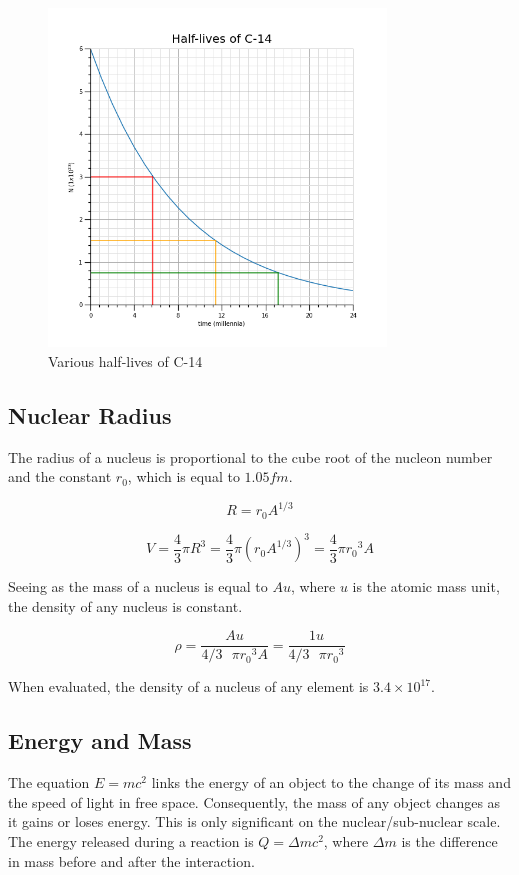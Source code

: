 \documentclass[12pt]{article}
\begin{document}
\begin{figure}[H]
\centering
\includegraphics[width=0.8\textwidth,keepaspectratio]{./images/c-14_t_half.png}
\caption{Various half-lives of C-14}
\end{figure}

\subsection{Nuclear Radius}
\label{sec:org4f10f62}

The radius of a nucleus is proportional to the cube root of the nucleon number and the constant \(r_0\), which is equal to \(1.05fm\).

\[R = r_0 A^{1/3}\]

\[V = \dfrac{4}{3} \pi R^3 = \dfrac{4}{3} \pi (r_0 A^{1/3})^3 = \dfrac{4}{3} \pi {r_0}^3 A\]

Seeing as the mass of a nucleus is equal to \(Au\), where \(u\) is the atomic mass unit, the density of any nucleus is constant.

\[\rho = \dfrac{Au}{4/3 \text{ } \pi {r_0}^3 A} = \dfrac{1u}{4/3 \text{ } \pi {r_0}^3}\]

When evaluated, the density of a nucleus of any element is \(3.4 \times 10^{17}\).

\subsection{Energy and Mass}
\label{sec:org691c0bf}

The equation \(E = mc^2\) links the energy of an object to the change of its mass and the speed of light in free space. Consequently, the mass of any object changes as it gains or loses energy. This is only significant on the nuclear/sub-nuclear scale. The energy released during a reaction is \(Q = \Delta mc^2\), where \(\Delta m\) is the difference in mass before and after the interaction.
\end{document}
